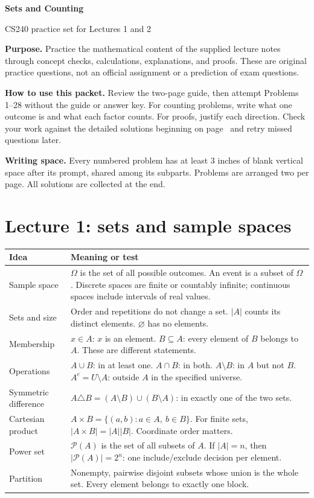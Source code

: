 \documentclass[11pt,letterpaper]{article}
\begin{document}
{\LARGE\bfseries Sets and Counting}\par
{\large CS240 practice set for Lectures 1 and 2}\par
\vspace{0.15in}
\textbf{Purpose.} Practice the mathematical content of the supplied lecture notes through concept checks, calculations, explanations, and proofs. These are original practice questions, not an official assignment or a prediction of exam questions.

\textbf{How to use this packet.} Review the two-page guide, then attempt Problems 1--28 without the guide or answer key. For counting problems, write what one outcome is and what each factor counts. For proofs, justify each direction. Check your work against the detailed solutions beginning on page~\pageref{solutions} and retry missed questions later.

\textbf{Writing space.} Every numbered problem has at least 3 inches of blank vertical space after its prompt, shared among its subparts. Problems are arranged two per page. All solutions are collected at the end.

\section*{Lecture 1: sets and sample spaces}
\begin{tabular}{@{}p{1.4in}p{5.55in}@{}}
\toprule
Idea & Meaning or test \\
\midrule
Sample space & $\Omega$ is the set of all possible outcomes. An event is a subset of $\Omega$. Discrete spaces are finite or countably infinite; continuous spaces include intervals of real values.\\[4pt]
Sets and size & Order and repetitions do not change a set. $|A|$ counts its distinct elements. $\varnothing$ has no elements.\\[4pt]
Membership & $x\in A$: $x$ is an element. $B\subseteq A$: every element of $B$ belongs to $A$. These are different statements.\\[4pt]
Operations & $A\cup B$: in at least one. $A\cap B$: in both. $A\setminus B$: in $A$ but not $B$. $A^c=U\setminus A$: outside $A$ in the specified universe.\\[4pt]
Symmetric difference & $A\triangle B=(A\setminus B)\cup(B\setminus A)$: in exactly one of the two sets.\\[4pt]
Cartesian product & $A\times B=\{(a,b):a\in A,\ b\in B\}$. For finite sets, $|A\times B|=|A||B|$. Coordinate order matters.\\[4pt]
Power set & $\mathcal P(A)$ is the set of all subsets of $A$. If $|A|=n$, then $|\mathcal P(A)|=2^n$: one include/exclude decision per element.\\[4pt]
Partition & Nonempty, pairwise disjoint subsets whose union is the whole set. Every element belongs to exactly one block.\\
\bottomrule
\end{tabular}
\end{document}
